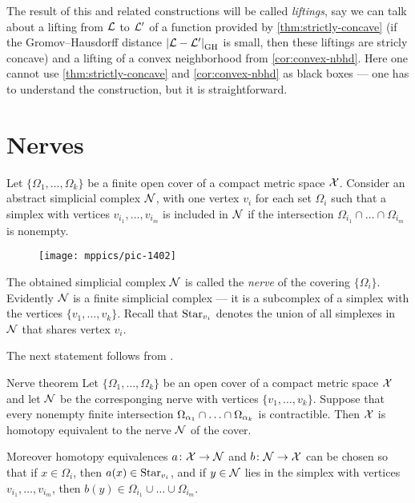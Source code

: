 The result of this and related constructions will be called \emph{liftings},
say we can talk about a lifting from $\mathcal{L}$ to $\mathcal{L}'$ of a function provided by \ref{thm:strictly-concave} (if the Gromov--Hausdorff distance $\dist{\spc{L}}{\spc{L}'}{\GH}$ is small, then these liftings are stricly concave)
and a lifting of a convex neighborhood from \ref{cor:convex-nbhd}.
Here one cannot use \ref{thm:strictly-concave} and \ref{cor:convex-nbhd} as black boxes --- one has to understand the construction, but it is straightforward.

\section{Nerves}

Let $\{\Omega_1,\dots,\Omega_k\}$ be a finite open cover of a compact metric space $\mathcal{X}$.
Consider an abstract simplicial complex $\mathcal{N}$, with one vertex $v_i$ for each set $\Omega_i$ such that a simplex with vertices $v_{i_1},\dots, v_{i_m}$ is included in $\mathcal{N}$ if 
the intersection $\Omega_{i_1}\cap\dots\cap \Omega_{i_m}$ is nonempty.
\begin{figure}[ht!]
\vskip-0mm
\centering
\texttt{[image: mppics/pic-1402]}
\end{figure}
The obtained simplicial complex $\mathcal{N}$ is called the \emph{nerve} of the covering $\{\Omega_i\}$.
Evidently $\mathcal{N}$ is a finite simplicial complex ---
it is a subcomplex of a simplex with the vertices $\{v_1,\dots,v_k\}$.
Recall that $\mathop{\rm Star}\nolimits_{v_i}$ denotes the union of all simplexes in $\mathcal{N}$ that shares vertex $v_i$.

The next statement follows from \cite[4G.3]{hatcher}.


\begin{thm}{Nerve theorem}
Let $\{\Omega_1,\dots,\Omega_k\}$ be an open cover of a compact metric space $\mathcal{X}$
and let $\mathcal{N}$ be the corresponging nerve with vertices $\{v_1,\dots,v_k\}$.
Suppose that every nonempty finite intersection $\Omega_{\alpha_1}\cap\z\dots\cap\Omega_{\alpha_k}$ is contractible.
Then $\mathcal{X}$ is homotopy equivalent to the nerve $\mathcal{N}$ of the cover.

Moreover homotopy equivalences  $a\colon\mathcal{X}\to \mathcal{N}$ and $b\colon\mathcal{N}\to\mathcal{X}$ can be chosen so that 
if $x\in \Omega_i$, then $a(x)\in \mathop{\rm Star}\nolimits_{v_i}$,
and if $y\in\mathcal{N}$ lies in the simplex with vertices $v_{i_1},\dots, v_{i_m}$, then $b(y)\in \Omega_{i_1}\cup\dots\cup \Omega_{i_m}$.
\end{thm}


